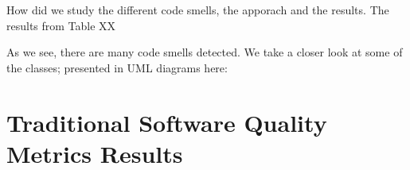 How did we study the different code smells, the apporach and the results.
The results from Table XX

As we see, there are many code smells detected. We take a closer look at some of the classes; presented in UML diagrams here:





















\section{Traditional Software Quality Metrics Results}
\label{sub:QA_metrics_results}



